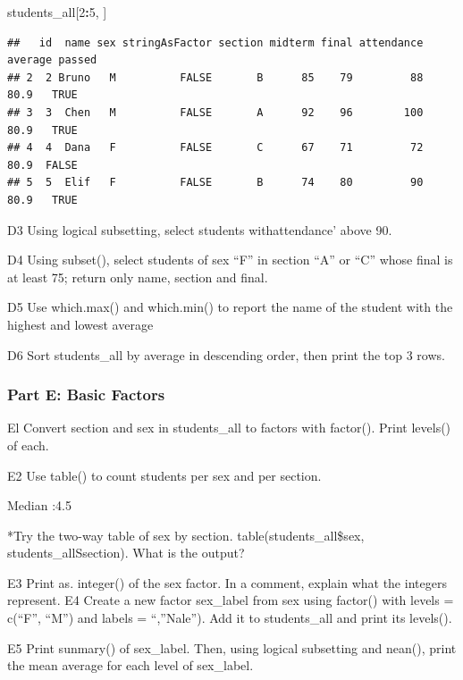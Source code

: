 \documentclass[
]{article}
\newenvironment{Shaded}{\begin{snugshade}}{\end{snugshade}}
\newcommand{\DecValTok}[1]{\textcolor[rgb]{0.00,0.00,0.81}{#1}}
\newcommand{\NormalTok}[1]{#1}
\newcommand{\SpecialCharTok}[1]{\textcolor[rgb]{0.81,0.36,0.00}{\textbf{#1}}}
\begin{document}
\begin{Shaded}
\begin{Highlighting}[]
\NormalTok{students\_all[}\DecValTok{2}\SpecialCharTok{:}\DecValTok{5}\NormalTok{, ]}
\end{Highlighting}
\end{Shaded}

\begin{verbatim}
##   id  name sex stringAsFactor section midterm final attendance average passed
## 2  2 Bruno   M          FALSE       B      85    79         88    80.9   TRUE
## 3  3  Chen   M          FALSE       A      92    96        100    80.9   TRUE
## 4  4  Dana   F          FALSE       C      67    71         72    80.9  FALSE
## 5  5  Elif   F          FALSE       B      74    80         90    80.9   TRUE
\end{verbatim}

D3 Using logical subsetting, select students withattendance' above 90.

D4 Using subset(), select students of sex ``F'' in section ``A'' or
``C'' whose final is at least 75; return only name, section and final.

D5 Use which.max() and which.min() to report the name of the student
with the highest and lowest average

D6 Sort students\_all by average in descending order, then print the top
3 rows.

\subsubsection{Part E: Basic Factors}\label{part-e-basic-factors}

El Convert section and sex in students\_all to factors with factor().
Print levels() of each.

E2 Use table() to count students per sex and per section.

Median :4.5

*Try the two-way table of sex by section. table(students\_all\$sex,
students\_allSsection). What is the output?

E3 Print as. integer() of the sex factor. In a comment, explain what the
integers represent. E4 Create a new factor sex\_label from sex using
factor() with levels = c(``F'', ``M'') and labels = ``,''Nale''). Add it
to students\_all and print its levels().

E5 Print sunmary() of sex\_label. Then, using logical subsetting and
nean(), print the mean average for each level of sex\_label.
\end{document}
